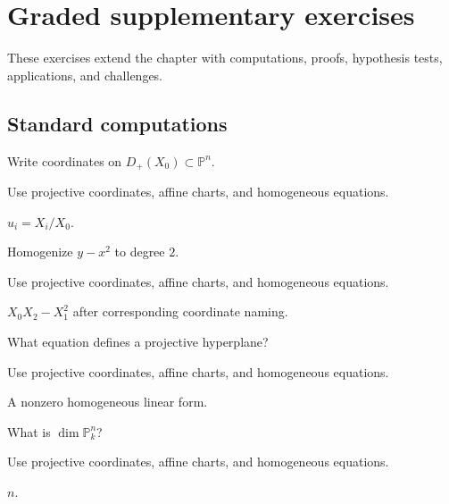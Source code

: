 \section{Graded supplementary exercises}
These exercises extend the chapter with computations, proofs, hypothesis tests, applications, and challenges.

\subsection*{Standard computations}

\begin{exercise}\label{exr:vi36-expand-01}
Write coordinates on $D_+(X_0)\subset\mathbb P^n$.
\end{exercise}
\begin{hint}
Use projective coordinates, affine charts, and homogeneous equations.
\end{hint}
\begin{solution}
$u_i=X_i/X_0$.
\end{solution}

\begin{exercise}[Homogenize]\label{exr:vi36-expand-02}
Homogenize $y-x^2$ to degree $2$.
\end{exercise}
\begin{hint}
Use projective coordinates, affine charts, and homogeneous equations.
\end{hint}
\begin{solution}
$X_0X_2-X_1^2$ after corresponding coordinate naming.
\end{solution}

\begin{exercise}[Hyperplane]\label{exr:vi36-expand-03}
What equation defines a projective hyperplane?
\end{exercise}
\begin{hint}
Use projective coordinates, affine charts, and homogeneous equations.
\end{hint}
\begin{solution}
A nonzero homogeneous linear form.
\end{solution}

\begin{exercise}[Dimension]\label{exr:vi36-expand-04}
What is $\dim\mathbb P^n_k$?
\end{exercise}
\begin{hint}
Use projective coordinates, affine charts, and homogeneous equations.
\end{hint}
\begin{solution}
$n$.
\end{solution}

